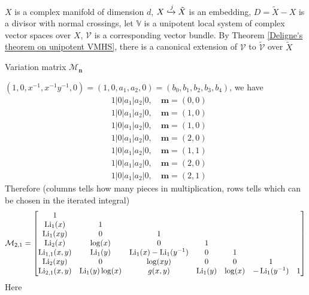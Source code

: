 \documentclass[main]{subfiles}
\begin{document}
\begin{definition}
$X$ is a complex manifold of dimension $d$, $X\xhookrightarrow j\tilde X$ is an embedding, $D=\tilde X-X$ is a divisor with normal crossings, let $\mathbb V$ is a unipotent local system of complex vector spaces over $X$, $\mathcal V$ is a corresponding vector bundle. By Theorem \ref{Deligne's theorem on unipotent VMHS}, there is a canonical extension of $\mathcal V$ to $\tilde{\mathcal V}$ over $\tilde X$
\end{definition}

\begin{definition}
Variation matrix $\mathcal M_{\mathbf n}$
\end{definition}

\begin{example}
$(1,0,x^{-1},x^{-1}y^{-1},0)=(1,0,a_1,a_2,0)=(b_0,b_1,b_2,b_3,b_4)$, we have
\begin{align*}
&\boxed{1}|0|a_1|a_2|\boxed0, \quad\mathbf m=(0,0) \\
&\boxed{1}|0|\boxed{a_1}|a_2|\boxed0, \quad\mathbf m=(1,0) \\
&\boxed{1}|0|a_1|\boxed{a_2}|\boxed0, \quad\mathbf m=(1,0) \\
&\boxed{1}|\boxed0|\boxed{a_1}|a_2|\boxed0, \quad\mathbf m=(2,0) \\
&\boxed{1}|0|\boxed{a_1}|\boxed{a_2}|\boxed0, \quad\mathbf m=(1,1) \\
&\boxed{1}|\boxed0|a_1|\boxed{a_2}|\boxed0, \quad\mathbf m=(2,0) \\
&\boxed{1}|\boxed0|\boxed{a_1}|\boxed{a_2}|\boxed0, \quad\mathbf m=(2,1)
\end{align*}
Therefore (columns tells how many pieces in multiplication, rows tells which can be chosen in the iterated integral)
\begin{align*}
\mathcal M_{2,1}=\begin{bmatrix}
1	&	&	&	&	&	& \\
\operatorname{Li}_1(x)	&1	&	&	&	&	& \\
\operatorname{Li}_1(xy)    &0	&1	&	&	&	& \\
\operatorname{Li}_2(x)    &\log(x)	&0	&1	&	&	& \\
\operatorname{Li}_{1,1}(x,y)    &\operatorname{Li}_1(y)	&\operatorname{Li}_1(x)-\operatorname{Li}_1(y^{-1})	&0	&1	&	& \\
\operatorname{Li}_2(xy)    &	0&\log(xy)	&0	&0	&1	& \\
\operatorname{Li}_{2,1}(x,y)    & \operatorname{Li}_1(y)\log(x)	&	g(x,y)&\operatorname{Li}_1(y)	&\log(x)	&-\operatorname{Li}_1(y^{-1})	&1
\end{bmatrix}
\end{align*}
Here
\begin{align*}

\end{align*}
\end{example}
\end{document}
